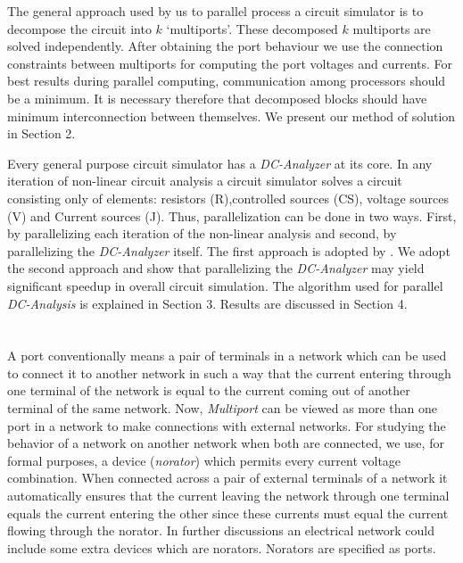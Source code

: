\documentclass[10pt,psfig,letterpaper,twocolumn]{article}
\begin{document}
The general approach used by us to parallel process a circuit simulator 
is to decompose the circuit into $k$ `multiports'. These
decomposed $k$ multiports are solved independently. 
After obtaining the port behaviour 
we use the connection constraints between multiports
for computing the port voltages and currents.
For best 
results during parallel computing, communication among processors should be a minimum. It is necessary therefore that  decomposed
blocks should have minimum interconnection between themselves.
We present our method of solution in
Section 2. 

Every general purpose circuit simulator has a {\it DC-Analyzer} at its core. In any iteration of non-linear circuit analysis a circuit simulator solves a 
circuit consisting only of elements: resistors (R),controlled sources (CS), voltage sources (V) and Current sources (J). Thus, parallelization can be done in two 
ways. First, by parallelizing each iteration of the non-linear analysis and second, by parallelizing the {\it DC-Analyzer} itself. The first 
approach is adopted by {\protect \cite{SIE}}. We adopt the second approach \cite{GAK,NJB,GT} and show that parallelizing the {\it DC-Analyzer} may yield 
significant speedup in overall circuit simulation. The algorithm used for parallel {\it DC-Analysis} is explained in Section 3. 
Results are discussed in Section 4. 

\section*{}

A port conventionally means a pair of terminals in a network which can be used to connect it to another network in such a way 
that the current entering through one terminal of the network is equal to the current coming out of 
another terminal of the same network. Now, {\it Multiport} can be viewed as more than one port in a network 
to make connections with external networks. For studying the behavior of a network on another network when both are
connected, we use, for formal purposes, a device ({\it norator}) which permits every current voltage combination. When connected across
a pair of external terminals of a network it automatically 
ensures that the current leaving the network through one terminal equals the current entering the other since these currents must equal
the current flowing through the norator. In further discussions an electrical 
network could include some extra devices which are  norators. Norators are specified as ports. \par
\end{document}

